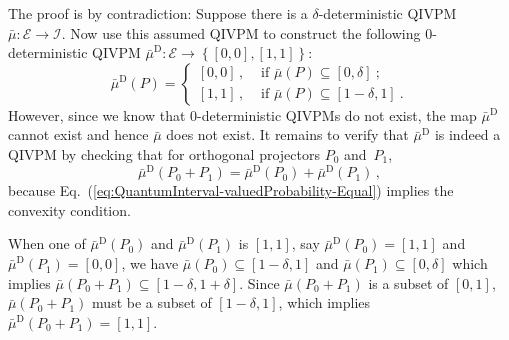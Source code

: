 \documentclass[english,reprint, aps, prl,superscriptaddress, showpacs,
showkeys, longbibliography, amsmath, amssymb, floatfix]{revtex4-1}
\theoremstyle{plain}
\theoremstyle{definition}
\newcommand{\events}{\ensuremath{\mathcal{E}}}
\newcommand{\imposs}{\ensuremath{\left[0,0\right]}}
\newcommand{\necess}{\ensuremath{\left[1,1\right]}}
\begin{document}
The proof is by contradiction: Suppose there is a $\delta$-deterministic
QIVPM~$\bar{\mu}:\events\rightarrow\mathscr{I}$. Now use this assumed
QIVPM to construct the following $0$-deterministic QIVPM $\bar{\mu}^{\textrm{D}}:\events\rightarrow\left\{ \imposs,\necess\right\} $:
\begin{equation}
\bar{\mu}^{\textrm{D}}\left(P\right)=\begin{cases}
\imposs\,, & \textrm{ if }\bar{\mu}\left(P\right)\subseteq\left[0,\delta\right]\:;\\
\necess\,, & \textrm{ if }\bar{\mu}\left(P\right)\subseteq\left[1-\delta,1\right]\:.
\end{cases}
\end{equation}
However, since we know that $0$-deterministic QIVPMs do not exist,
the map $\bar{\mu}^{\textrm{D}}$ cannot exist and hence $\bar{\mu}$
does not exist. It remains to verify that $\bar{\mu}^{\textrm{D}}$
is indeed a QIVPM by checking that for orthogonal projectors $P_{0}$
and~$P_{1}$, 
\begin{equation}
\bar{\mu}^{\textrm{D}}\left(P_{0}+P_{1}\right)=\bar{\mu}^{\textrm{D}}\left(P_{0}\right)+\bar{\mu}^{\textrm{D}}\left(P_{1}\right)\,,\label{eq:QuantumInterval-valuedProbability-Equal}
\end{equation}
because Eq.~(\ref{eq:QuantumInterval-valuedProbability-Equal}) implies
the convexity condition.

When one of $\bar{\mu}^{\textrm{D}}\left(P_{0}\right)$ and $\bar{\mu}^{\textrm{D}}\left(P_{1}\right)$
is $\necess$, say $\bar{\mu}^{\textrm{D}}\left(P_{0}\right)=\necess$
and $\bar{\mu}^{\textrm{D}}\left(P_{1}\right)=\imposs$, we have $\bar{\mu}\left(P_{0}\right)\subseteq\left[1-\delta,1\right]$
and $\bar{\mu}\left(P_{1}\right)\subseteq\left[0,\delta\right]$ which
implies $\bar{\mu}\left(P_{0}+P_{1}\right)\subseteq\left[1-\delta,1+\delta\right]$.
Since $\bar{\mu}\left(P_{0}+P_{1}\right)$ is a subset of $\left[0,1\right]$,
$\bar{\mu}\left(P_{0}+P_{1}\right)$ must be a subset of $\left[1-\delta,1\right]$,
which implies $\bar{\mu}^{\textrm{D}}\left(P_{0}+P_{1}\right)=\necess$.
\end{document}
